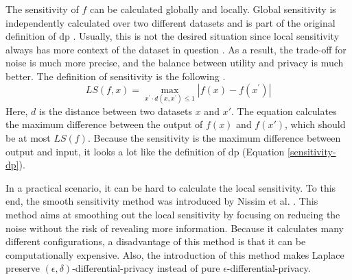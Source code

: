 The sensitivity of $f$ can be calculated globally and locally.
Global sensitivity is independently calculated over two different datasets and is part of the original definition of \gls{dp} \citep{dwork_differential_2006}.
Usually, this is not the desired situation since local sensitivity always has more context of the dataset in question \citep{nissim_smooth_2007}.
As a result, the trade-off for noise is much more precise, and the balance between utility and privacy is much better.
The definition of sensitivity is the following \citep{nissim_smooth_2007}.
\begin{equation}
  LS(f,x)=\operatorname*{max}_{x^{\prime}\cdot d(x,x^{\prime})\leq1}|f(x)-f(x^{\prime})|
  \label{local-sensitivity}
\end{equation}
Here, $d$ is the distance between two datasets $x$ and $x'$.
The equation calculates the maximum difference between the output of $f(x)$ and $f(x')$, which should be at most $LS(f)$.
Because the sensitivity is the maximum difference between output and input, it looks a lot like the definition of \gls{dp} (Equation \ref{sensitivity-dp}).

In a practical scenario, it can be hard to calculate the local sensitivity.
To this end, the smooth sensitivity method was introduced by Nissim et al.  \citep{nissim_smooth_2007}.
This method aims at smoothing out the local sensitivity by focusing on reducing the noise without the risk of revealing more information.
Because it calculates many different configurations, a disadvantage of this method is that it can be computationally expensive.
Also, the introduction of this method makes Laplace preserve $(\epsilon, \delta)$-differential-privacy instead of pure $\epsilon$-differential-privacy.



\newpage
